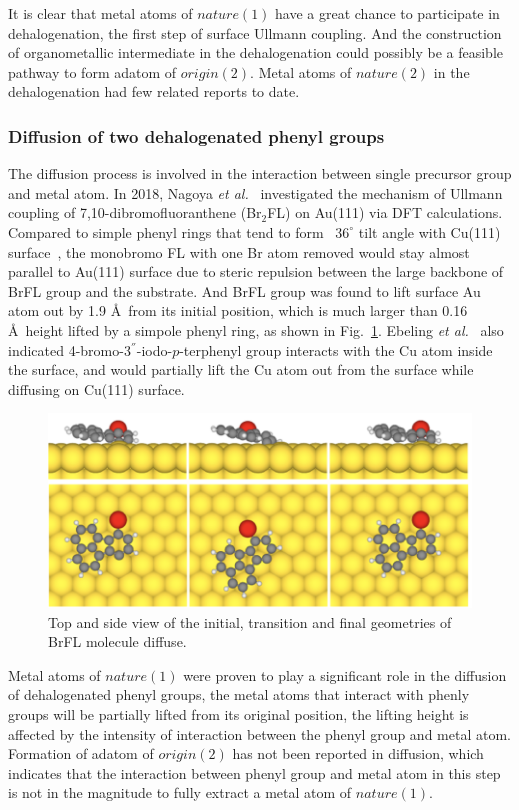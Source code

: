 \documentclass[%
 reprint,
 amsmath,amssymb,
 aps,
prb,
]{revtex4-2}
\begin{document}
It is clear that metal atoms of $nature(1)$ have a great chance to participate in dehalogenation, the first step of surface Ullmann coupling. And the construction of organometallic intermediate in the dehalogenation could possibly be a feasible pathway to form adatom of $origin(2)$. Metal atoms of $nature(2)$ in the dehalogenation had few related reports to date.

\subsubsection{Diffusion of two dehalogenated phenyl groups}

The diffusion process is involved in the interaction between single precursor group and metal atom. 
In 2018, Nagoya \textit{et al.}~\cite{jpcc2018} investigated the mechanism of Ullmann coupling of 7,10-dibromofluoranthene (Br$_{2}$FL) on Au(111) via DFT calculations. Compared to simple phenyl rings that tend to form ~$36^\circ$ tilt angle with Cu(111) surface~\cite{pccp2010}, the monobromo FL with one Br atom removed would stay almost parallel to Au(111) surface due to steric repulsion between the large backbone of BrFL group and the substrate. And BrFL group was found to lift surface Au atom out by 1.9 \AA\ from its initial position, which is much larger than 0.16 \AA\ height lifted by a simpole phenyl ring, as shown in Fig.~\ref{fig:diff}.
Ebeling \textit{et al.}~\cite{acsnano2019} also indicated 4-bromo-3$^{''}$-iodo-$p$-terphenyl group interacts with the Cu atom inside the surface, and would partially lift the Cu atom out from the surface while diffusing on Cu(111) surface. 
\begin{figure}[hbt]
\centering
\includegraphics[width=0.75\columnwidth]{Fig/Diffusion_path.png}
\caption{Top and side view of the initial, transition and final geometries of BrFL molecule diffuse.}
\label{fig:diff}
\end{figure}

Metal atoms of $nature(1)$ were proven to play a significant role in the diffusion of dehalogenated phenyl groups, the metal atoms that interact with phenly groups will be partially lifted from its original position, the lifting height is affected by the intensity of interaction between the phenyl group and metal atom. Formation of adatom of $origin(2)$ has not been reported in diffusion, which indicates that the interaction between phenyl group and metal atom in this step is not in the magnitude to fully extract a metal atom of $nature(1)$. 
\end{document}
